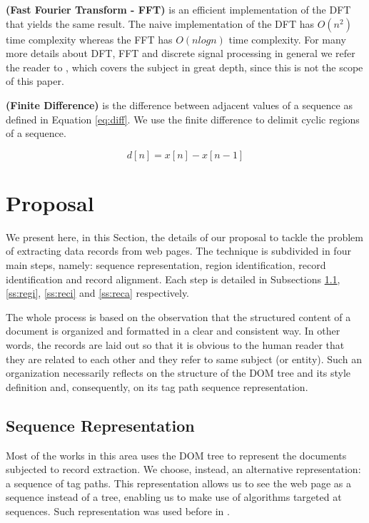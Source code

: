 \documentclass{vldb}
\begin{document}
\begin{definition}\textbf{(Fast Fourier Transform - FFT)} is an efficient
implementation of the DFT that yields the same result. The naive implementation
of the DFT has $O(n^2)$ time complexity whereas the FFT has $O(nlogn)$ time
complexity. For many more details about DFT, FFT and discrete signal
processing in general we refer the reader to \cite{oppenheim1989discrete},
which covers the subject in great depth, since this is not the scope of this
paper.
\end{definition}

\begin{definition}\textbf{(Finite Difference)} is the difference between
adjacent values of a sequence as defined in Equation \ref{eq:diff}. We use the
finite difference to delimit cyclic regions of a sequence.

\begin{equation}\label{eq:diff}
    d[n] = x[n] - x[n - 1]
\end{equation}
\end{definition}

\section{Proposal}\label{sec:prop}
We present here, in this Section, the details of our proposal to tackle the
problem of extracting data records from web pages. The technique is subdivided
in four main steps, namely: sequence representation, region identification,
record identification and record alignment. Each step is detailed in Subsections
\ref{ss:seq}, \ref{ss:regi}, \ref{ss:reci} and \ref{ss:reca} respectively.

The whole process is based on the observation that the structured content of a
document is organized and formatted in a clear and consistent way. In other
words, the records are laid out so that it is obvious to the human reader that
they are related to each other and they refer to same subject (or entity). Such
an organization necessarily reflects on the structure of the DOM tree and its
style definition and, consequently, on its tag path sequence representation.

\subsection{Sequence Representation}\label{ss:seq}
Most of the works in this area uses the DOM tree to represent the documents
subjected to record extraction. We choose, instead, an alternative
representation: a sequence of tag paths. This representation allows us to see
the web page as a sequence instead of a tree, enabling us to make use of
algorithms targeted at sequences. Such representation was used before in
\cite{TPC09, SuffixTree12, TPS2013}.
\end{document}
